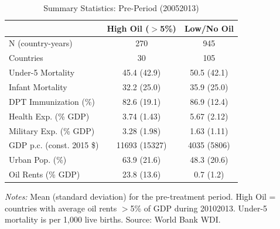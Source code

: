 \begin{table}[H]
\centering
\caption{Summary Statistics: Pre-Period (2005\textendash{}2013)}
\label{tab:summary}
\begin{threeparttable}
\begin{tabular}{lcc}
\toprule
& High Oil ($>$5\%) & Low/No Oil \\
\midrule
N (country-years) & 270 & 945 \\
Countries & 30 & 105 \\
Under-5 Mortality & 45.4 (42.9) & 50.5 (42.1) \\
Infant Mortality & 32.2 (25.0) & 35.9 (25.0) \\
DPT Immunization (\%) & 82.6 (19.1) & 86.9 (12.4) \\
Health Exp. (\% GDP) & 3.74 (1.43) & 5.67 (2.12) \\
Military Exp. (\% GDP) & 3.28 (1.98) & 1.63 (1.11) \\
GDP p.c. (const. 2015 \$) & 11693 (15327) & 4035 (5806) \\
Urban Pop. (\%) & 63.9 (21.6) & 48.3 (20.6) \\
Oil Rents (\% GDP) & 23.8 (13.6) & 0.7 (1.2) \\
\bottomrule
\end{tabular}
\begin{tablenotes}\small
\item \textit{Notes:} Mean (standard deviation) for the pre-treatment period. High Oil = countries with average oil rents $>$5\% of GDP during 2010\textendash{}2013. Under-5 mortality is per 1,000 live births. Source: World Bank WDI.
\end{tablenotes}
\end{threeparttable}
\end{table}
